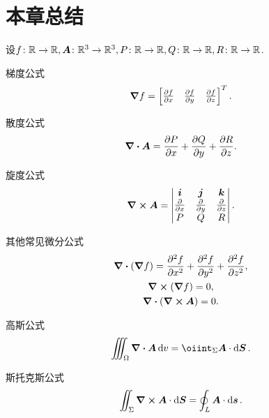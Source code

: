 \section{本章总结}
设\(f\colon\mathbb{R}\to\mathbb{R},
\boldsymbol{A}\colon\mathbb{R}^3\to\mathbb{R}^3,
P\colon\mathbb{R}\to\mathbb{R},
Q\colon\mathbb{R}\to\mathbb{R},
R\colon\mathbb{R}\to\mathbb{R}\).

梯度公式\[
	\grad f
	= \begin{bmatrix}
		\pdv{f}{x} & \pdv{f}{y} & \pdv{f}{z}
	\end{bmatrix}^T.
\]

散度公式\[
	\div{\boldsymbol{A}}
	= \pdv{P}{x}+\pdv{Q}{y}+\pdv{R}{z}.
\]

旋度公式\[
	\curl{\boldsymbol{A}}
	= \begin{vmatrix}
		\boldsymbol{i} & \boldsymbol{j} & \boldsymbol{k} \\
		\pdv{x} & \pdv{y} & \pdv{z} \\
		P & Q & R
	\end{vmatrix}.
\]

其他常见微分公式\begin{gather*}
	\div(\grad f)
	= \pdv[2]{f}{x} + \pdv[2]{f}{y} + \pdv[2]{f}{z}, \\
	\curl(\grad f)
	= 0, \\
	\div(\curl \boldsymbol{A})
	= 0.
\end{gather*}

高斯公式\[
	\iiint_\Omega \div{\vb{A}} \dd{v}
	= \oiint_\Sigma \vb{A} \cdot \dd{\vb{S}}.
\]

斯托克斯公式\[
	\iint_\Sigma \curl{\boldsymbol{A}} \cdot \dd{\boldsymbol{S}}
	= \oint_L \boldsymbol{A} \cdot \dd{\boldsymbol{s}}.
\]

